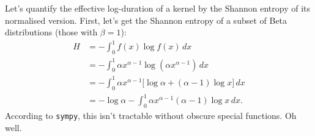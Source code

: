 \documentclass[a4paper, 12pt]{article}
\begin{document}
Let's quantify the effective log-duration of a kernel by the Shannon entropy of
its normalised version. First, let's get the Shannon entropy of a subset of
Beta distributions (those with $\beta=1$):
\begin{align}
H
    &= -\int_0^1 f(x) \log f(x) \, dx \\
    &= -\int_0^1 \alpha x^{\alpha-1} \log \left(\alpha x^{\alpha-1}\right)
            \, dx \\
    &= -\int_0^1 \alpha x^{\alpha-1}
                \Big[\log\alpha + (\alpha-1)\log x\Big] \, dx \\
    &= -\log\alpha - \int_0^1 \alpha x^{\alpha-1}(\alpha-1)\log x \, dx.
\end{align}
According to {\tt sympy}, this isn't tractable without obscure special
functions. Oh well.
\end{document}
